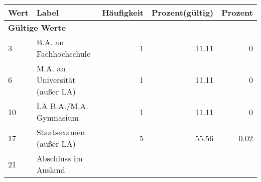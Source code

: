      \begin{longtable}{lXrrr}
     \toprule
     \textbf{Wert} & \textbf{Label} & \textbf{Häufigkeit} & \textbf{Prozent(gültig)} & \textbf{Prozent} \\
     \endhead
     \midrule
     \multicolumn{5}{l}{\textbf{Gültige Werte}}\\

     3 &
     \multicolumn{1}{X}{ B.A. an Fachhochschule   } &


       \num{1} &
       \num[round-mode=places,round-precision=2]{11.11} &
         \num[round-mode=places,round-precision=2]{0} \\

     6 &
     \multicolumn{1}{X}{ M.A. an Universität (außer LA)   } &


       \num{1} &
       \num[round-mode=places,round-precision=2]{11.11} &
         \num[round-mode=places,round-precision=2]{0} \\

     10 &
     \multicolumn{1}{X}{ LA B.A./M.A. Gymnasium   } &


       \num{1} &
       \num[round-mode=places,round-precision=2]{11.11} &
         \num[round-mode=places,round-precision=2]{0} \\

     17 &
     \multicolumn{1}{X}{ Staatsexamen (außer LA)   } &


       \num{5} &
       \num[round-mode=places,round-precision=2]{55.56} &
         \num[round-mode=places,round-precision=2]{0.02} \\

     21 &
     \multicolumn{1}{X}{ Abschluss im Ausland   } &



\end{longtable}
